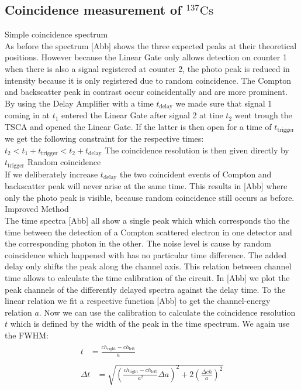 \subsection{Coincidence measurement of $^{137}\text{Cs}$}
%
Simple coincidence spectrum \\
%
As before the spectrum [Abb] shows the three expected peaks at their theoretical positions. However because the Linear Gate only allows detection on counter 1 when there is also a signal registered at counter 2, the photo peak is reduced in intensity because it is only registered due to random coincidence. The Compton and backscatter peak in contrast occur coincidentally and are more prominent.
By using the Delay Amplifier with a time $t_{\text{delay}}$ we made sure that signal 1 coming in at $t_1$ entered the Linear Gate after signal 2 at tine $t_2$ went trough the TSCA and opened the Linear Gate. If the latter is then open for a time of $t_{\text{trigger}}$ we get the following constraint for the respective times:
$t_2 < t_1 + t_{\text{trigger}} < t_2 +  t_{\text{delay}}$
The coincidence resolution is then given directly by $t_{\text{trigger}}$
%
Random coincidence \\
%
If we deliberately increase $t_{\text{delay}}$ the two coincident events of Compton and backscatter peak will never arise at the same time. This results in [Abb] where only the photo peak is visible, because  random coincidence still occurs as before.
%
Improved Method \\
%
The time spectra [Abb] all show a single peak which which corresponds tho the time between the detection of a Compton scattered electron in one detector and the corresponding photon in the other.
The noise level is cause by random coincidence which happened with has no particular time difference.
The added delay only shifts the peak along the channel axis. This relation between channel time allows to calculate the time calibration of the circuit.
In [Abb] we plot the peak channels of the differently delayed spectra against the delay time. To the linear relation we fit a respective function [Abb] to get the channel-energy relation $a$.
Now we can use the calibration to calculate the coincidence resolution $t$ which is defined by the width of the peak in the time spectrum. We again use the FWHM:
%
\begin{align}
    \label{eq:CoincidenceResolution}
    \begin{split}
        t &= \frac{ch_{\text{right}}-ch_{\text{left}}}{a}
    \end{split}
    \\
    \label{eq:DeltaCoincidenceResolution}
    \begin{split}
        \Delta t &= \sqrt{ \left (  \frac{ch_{\text{right}}-ch_{\text{left}}}{a^2} \Delta a \right)^2 + 2 \left ( \frac{ \Delta ch }{a}\right)^2 }
    \end{split}
\end{align}
